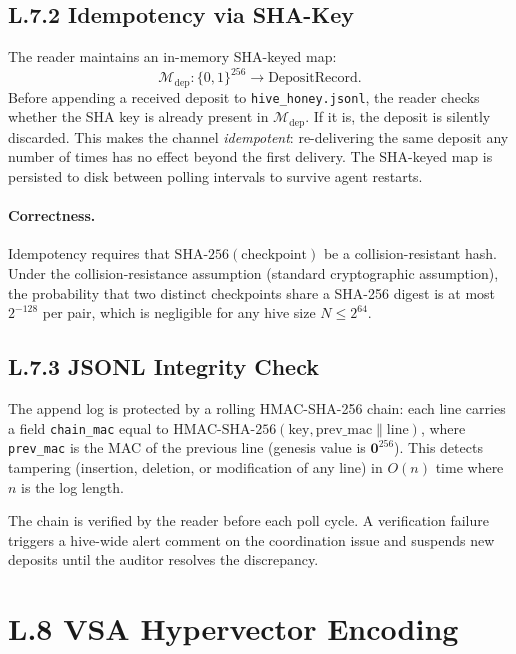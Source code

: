 \subsection*{L.7.2 \quad Idempotency via SHA-Key}

The reader maintains an in-memory SHA-keyed map:
\[
  \mathcal{M}_{\text{dep}} : \{0,1\}^{256} \to \text{DepositRecord}.
\]
Before appending a received deposit to \texttt{hive\_honey.jsonl}, the
reader checks whether the SHA key is already present in
$\mathcal{M}_{\text{dep}}$.  If it is, the deposit is silently
discarded.  This makes the channel \emph{idempotent}: re-delivering the
same deposit any number of times has no effect beyond the first
delivery.  The SHA-keyed map is persisted to disk between polling
intervals to survive agent restarts.

\paragraph{Correctness.}  Idempotency requires that
$\text{SHA-256}(\text{checkpoint})$ be a collision-resistant hash.
Under the collision-resistance assumption (standard cryptographic
assumption), the probability that two distinct checkpoints share a
SHA-256 digest is at most $2^{-128}$ per pair, which is negligible for
any hive size $N \leq 2^{64}$.

\subsection*{L.7.3 \quad JSONL Integrity Check}

The append log is protected by a rolling HMAC-SHA-256 chain:
each line carries a field \texttt{chain\_mac} equal to
$\mathrm{HMAC}\text{-SHA-256}(\text{key}, \text{prev\_mac} \| \text{line})$,
where \texttt{prev\_mac} is the MAC of the previous line (genesis value
is $\mathbf{0}^{256}$).  This detects tampering (insertion, deletion,
or modification of any line) in $O(n)$ time where $n$ is the log
length.

The chain is verified by the reader before each poll cycle.  A
verification failure triggers a hive-wide alert comment on the
coordination issue and suspends new deposits until the auditor
resolves the discrepancy.

\section*{L.8 \quad VSA Hypervector Encoding}
\label{sec:appl-vsa}

